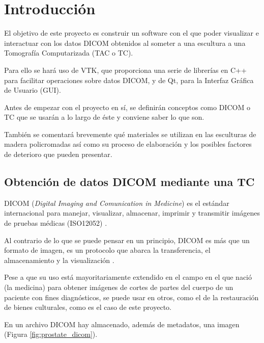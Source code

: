 \chapter{Introducción}

El objetivo de este proyecto es construir un software con el que poder visualizar e interactuar con los datos DICOM obtenidos al someter a una escultura a una Tomografía Computarizada (TAC o TC). 

Para ello se hará uso de VTK, que proporciona una serie de librerías en C++ para facilitar operaciones sobre datos DICOM, y de Qt, para la Interfaz Gráfica de Usuario (GUI).

Antes de empezar con el proyecto en sí, se definirán conceptos como DICOM o TC que se usarán a lo largo de éste y conviene saber lo que son. 

También se comentará brevemente qué materiales se utilizan en las esculturas de madera policromadas así como su proceso de elaboración y los posibles factores de deterioro que pueden presentar.

\section{Obtención de datos DICOM mediante una TC}

DICOM (\textit{Digital Imaging and Comunication in Medicine}) es el estándar internacional para manejar, visualizar, almacenar, imprimir y transmitir imágenes de pruebas médicas (ISO12052) \cite{about_dicom}. 

Al contrario de lo que se puede pensar en un principio, DICOM es más que un formato de imagen, es un protocolo que abarca la transferencia, el almacenamiento y la visualización \cite{dicom_intro_and_guide}.

Pese a que su uso está mayoritariamente extendido en el campo en el que nació (la medicina) para obtener imágenes de cortes de partes del cuerpo de un paciente con fines diagnósticos, se puede usar en otros, como el de la restauración de bienes culturales, como es el caso de este proyecto.

En un archivo DICOM hay almacenado, además de metadatos, una imagen \cite{dicom_classes_vtk} (Figura \ref{fig:prostate_dicom}).

